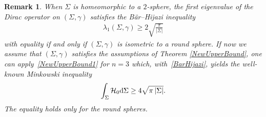 \documentclass[10pt,a4paper]{amsart}
\numberwithin{equation}{section}
\newtheorem{Remark}[Theorem]{Remark}
\begin{document}
\begin{Remark}\label{MinkowskiInequality-EuclideanSpace}
When $\Sigma$ is homeomorphic to a $2$-sphere, the first eigenvalue of the Dirac operator on $(\Sigma,\gamma)$ satisfies the B\"ar--Hijazi inequality~\cite{Bar3,Hijazi2,Hijazi1}
\begin{gather}\label{BarHijazi}
\lambda_1(\Sigma,\gamma)\geq 2\sqrt{\frac{\pi}{|\Sigma|}}
\end{gather}
with equality if and only if $(\Sigma,\gamma)$ is isometric to a round sphere. If now we assume that $(\Sigma,\gamma)$ satisfies the assumptions of Theorem \ref{NewUpperBound}, one can apply~\eqref{NewUpperBound1} for $n=3$ which, with~\eqref{BarHijazi}, yields the well-known Minkowski inequality
\begin{gather*}
\int_\Sigma \mathcal{H}_0{\rm d}\Sigma\geq 4\sqrt{\pi\,|\Sigma|}.
\end{gather*}
The equality holds only for the round spheres.
\end{Remark}
\end{document}
